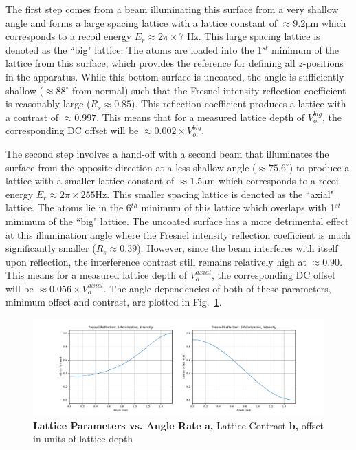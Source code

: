 The first step comes from a beam illuminating this surface from a very shallow angle and forms a large spacing lattice with a lattice constant of $\approx 9.2 \mathrm{\mu m}$ which corresponds to a recoil energy $E_r \approx 2 \pi \times 7$ Hz. This large spacing lattice is denoted as the ``big" lattice. The atoms are loaded into the 1$^{st}$ minimum of the lattice from this surface, which provides the reference for defining all $z$-positions in the apparatus. While this bottom surface is uncoated, the angle is sufficiently shallow ($\approx 88^\circ$ from normal) such that the Fresnel intensity reflection coefficient is reasonably large ($R_s\approx  0.85$). This reflection coefficient produces a lattice with a  contrast of $\approx 0.997$. This means that for a measured lattice depth of $V_o^{big}$, the corresponding DC offset will be $\approx 0.002 \times V_o^{big}$.

The second step involves a hand-off with a second beam that illuminates the surface from the opposite direction at a less shallow angle ($\approx 75.6^\circ$) to produce a lattice with a smaller lattice constant of $\approx 1.5 \mathrm{\mu m}$ which corresponds to a recoil energy $E_r \approx 2 \pi \times 255$Hz. This smaller spacing lattice is denoted as the ``axial" lattice. The atoms lie in the 6$^{th}$ minimum of this lattice which overlaps with 1$^{st}$ minimum of the ``big" lattice. The uncoated surface has a more detrimental effect at this illumination angle where the Fresnel intensity reflection coefficient is much significantly smaller ($R_s \approx 0.39$). However, since the beam interferes with itself upon reflection, the interference contrast still remains relatively high at $\approx 0.90$. This means for a measured lattice depth of $V_o^{axial}$, the corresponding DC offset will be $\approx 0.056 \times V_o^{axial}$. The angle dependencies of both of these parameters, minimum offset and contrast, are plotted in Fig.~\ref{fig:axLatt}.

\begin{figure}[ht!]
		\includegraphics[width=\columnwidth]{figures/ch2/heating_rates/axLatRef.pdf} 
		\caption{\textbf{Lattice Parameters vs. Angle Rate a,} Lattice Contrast \textbf{b,} offset in units of lattice depth }
		\label{fig:axLatt}	
\end{figure}

